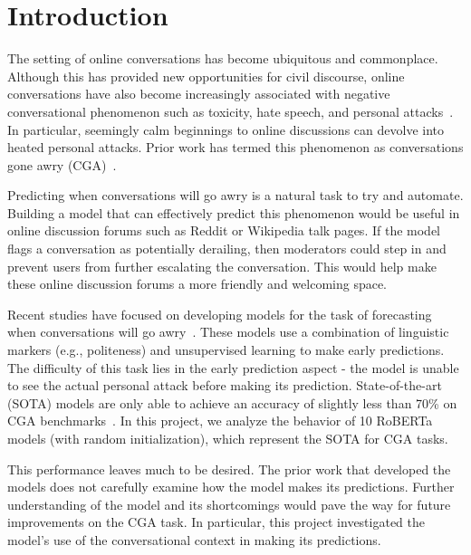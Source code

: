 \section{Introduction}
The setting of online conversations has become ubiquitous and commonplace. 
Although this has provided new opportunities for civil discourse, online conversations have also become increasingly associated with negative conversational phenomenon such as toxicity, hate speech, and personal attacks~\citep{Cheng_Danescu-Niculescu-Mizil_Leskovec_2021}.
In particular, seemingly calm beginnings to online discussions can devolve into heated personal attacks. 
Prior work has termed this phenomenon as conversations gone awry (CGA)~\citep{zhang-etal-2018-conversations, chang-danescu-niculescu-mizil-2019-trouble}.

Predicting when conversations will go awry is a natural task to try and automate. 
Building a model that can effectively predict this phenomenon would be useful in online discussion forums such as Reddit or Wikipedia talk pages. 
If the model flags a conversation as potentially derailing, then moderators could step in and prevent users from further escalating the conversation. 
This would help make these online discussion forums a more friendly and welcoming space. 

Recent studies have focused on developing models for the task of forecasting when conversations will go awry~\citep{zhang-etal-2018-conversations, chang-danescu-niculescu-mizil-2019-trouble, Yuan_Singh_2023}. 
These models use a combination of linguistic markers (e.g., politeness) and unsupervised learning to make early predictions. 
The difficulty of this task lies in the early prediction aspect - the model is unable to see the actual personal attack before making its prediction. 
State-of-the-art (SOTA) models are only able to achieve an accuracy of slightly less than 70\% on CGA benchmarks~\citep{zhang-etal-2018-conversations, chang-danescu-niculescu-mizil-2019-trouble, Yuan_Singh_2023}. In this project, we analyze the behavior of 10 RoBERTa models (with random initialization), which represent the SOTA for CGA tasks.

This performance leaves much to be desired. 
The prior work that developed the models does not carefully examine how the model makes its predictions. 
Further understanding of the model and its shortcomings would pave the way for future improvements on the CGA task. 
In particular, this project investigated the model's use of the conversational context in making its predictions. 

